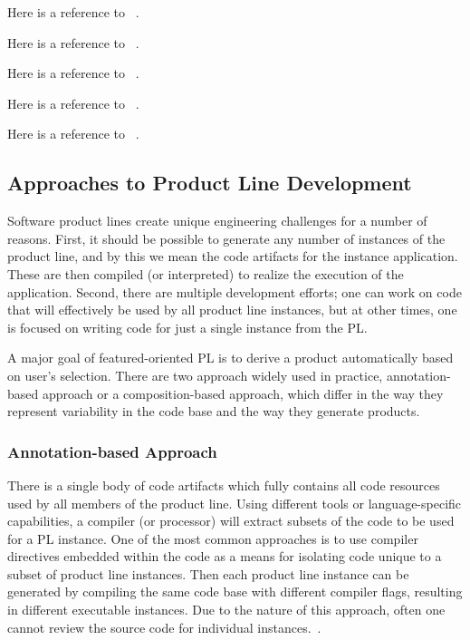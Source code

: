 Here is a reference to ~\cite{Arcaini:2017:ARV:3106195.3106206}.

Here is a reference to ~\cite{Heineman:2015:TMO:2791060.2791076}.

Here is a reference to ~\cite{Vasilevskiy:2016:TRP:2934466.2934484}.

Here is a reference to ~\cite{Kuhn:2015:CPC:2791060.2791092}.

Here is a reference to ~\cite{Schaefer:2010:DPS:1885639.1885647}.







\subsection{Approaches to Product Line Development}

Software product lines create unique engineering challenges for a number of reasons. First, it should be
possible to generate any number of  instances of the product line, and by this we mean the code artifacts
for the instance application. These are then compiled (or interpreted) to realize the execution of the
application. Second, there are multiple development efforts; one can work on code that will effectively be
used by all product line instances, but at other times, one is focused on writing code for just a single
instance from the PL.

A major goal of featured-oriented PL is to derive a product automatically based on user’s selection. There are
two approach widely used in practice,  annotation-based approach or a composition-based approach, which differ in
the way they represent variability in the code base and the way they generate products.


\subsubsection{Annotation-based Approach}

There is a single body of code artifacts which fully contains all code resources used by all members of the product line.
Using different tools or language-specific capabilities, a compiler (or processor) will extract subsets of the code to be used
 for a PL instance. One of the most common approaches is to use compiler directives embedded within the code as a means
 for isolating code unique to a subset of product line instances. Then each product line instance can be generated
 by compiling the same code base with different compiler flags, resulting in different executable instances.
 Due to the nature of this approach, often one cannot review the source code for individual instances.~\cite{Apel:2013:FSP:2541773}.

